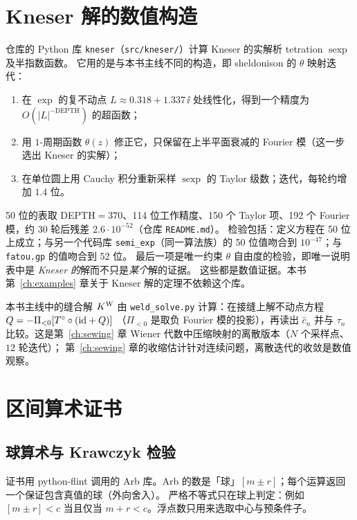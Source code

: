 \section{Kneser 解的数值构造}\label{ch11:sec:kneser}

仓库的 Python 库 \texttt{kneser}（\texttt{src/kneser/}）计算 Kneser 的实解析 tetration $\operatorname{sexp}$ 及半指数函数。
它用的是与本书主线不同的构造，即 sheldonison 的 $\theta$ 映射迭代：
\begin{enumerate}
\item 在 $\exp$ 的复不动点 $L\approx0.318+1.337\,\ii$ 处线性化，得到一个精度为 $O(|L|^{-\mathrm{DEPTH}})$ 的超函数；
\item 用 $1$-周期函数 $\theta(z)$ 修正它，只保留在上半平面衰减的 Fourier 模（这一步选出 Kneser 的实解）；
\item 在单位圆上用 Cauchy 积分重新采样 $\operatorname{sexp}$ 的 Taylor 级数；迭代，每轮约增加 $1.4$ 位。
\end{enumerate}
50 位的表取 DEPTH$=370$、114 位工作精度、150 个 Taylor 项、192 个 Fourier 模，约 30 轮后残差 $2.6\cdot10^{-52}$（仓库 \texttt{README.md}）。
检验包括：定义方程在 50 位上成立；与另一个代码库 \texttt{semi\_\allowbreak{}exp}（同一算法族）的 50 位值吻合到 $10^{-47}$；与 \texttt{fatou.gp} 的值吻合到 52 位。
最后一项是唯一约束 $\theta$ 自由度的检验，即唯一说明表中是 \emph{Kneser 的}解而不只是\emph{某个}解的证据。
这些都是数值证据。本书第~\ref{ch:examples} 章关于 Kneser 解的定理不依赖这个库。

本书主线中的缝合解 $K^{\mathrm W}$ 由 \texttt{weld\_\allowbreak{}solve.py} 计算：在接缝上解不动点方程 $Q=-\Pi_{<0}[T^\circ\circ(\mathrm{id}+Q)]$
（$\Pi_{<0}$ 是取负 Fourier 模的投影），再读出 $\hat c_n$ 并与 $\tau_n$ 比较。这是第~\ref{ch:sewing} 章 Wiener 代数中压缩映射的离散版本（$N$ 个采样点、$12$ 轮迭代）；
第~\ref{ch:sewing} 章的收缩估计针对连续问题，离散迭代的收敛是数值观察。

\section{区间算术证书}\label{ch11:sec:certificates}

\subsection{球算术与 Krawczyk 检验}
证书用 python-flint 调用的 Arb 库\cite{Johansson2017Arb}。Arb 的数是「球」$[m\pm r]$；每个运算返回一个保证包含真值的球（外向舍入）。
严格不等式只在球上判定：例如 $[m\pm r]<c$ 当且仅当 $m+r<c$。浮点数只用来选取中心与预条件子。

